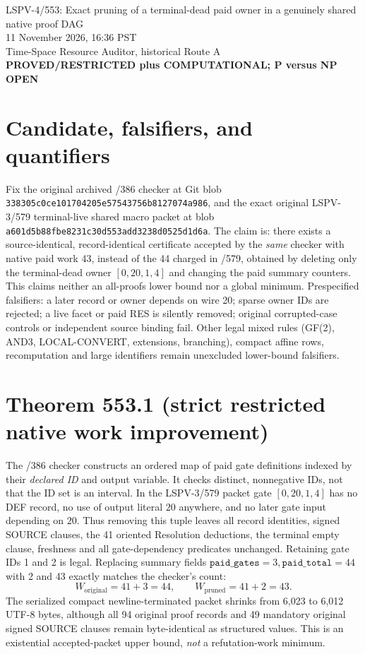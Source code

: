 \documentclass[11pt]{article}
\begin{document}
\begin{center}
{\Large LSPV-4/553: Exact pruning of a terminal-dead paid owner in a genuinely shared native proof DAG}\\[4pt]
11 November 2026, 16:36 PST\\
Time-Space Resource Auditor, historical Route A\\
\textbf{PROVED/RESTRICTED plus COMPUTATIONAL; P versus NP OPEN}
\end{center}
\section*{Candidate, falsifiers, and quantifiers}
Fix the original archived /386 checker at Git blob \texttt{338305c0ce101704205e57543756b8127074a986}, and the exact original LSPV-3/579 terminal-live shared macro packet at blob \texttt{a601d5b88fbe8231c30d553add3238d0525d1d6a}. The claim is: there exists a source-identical, record-identical certificate accepted by the \emph{same} checker with native paid work 43, instead of the 44 charged in /579, obtained by deleting only the terminal-dead owner \([0,20,1,4]\) and changing the paid summary counters. This claims neither an all-proofs lower bound nor a global minimum.
Prespecified falsifiers: a later record or owner depends on wire 20; sparse owner IDs are rejected; a live facet or paid RES is silently removed; original corrupted-case controls or independent source binding fail. Other legal mixed rules (GF(2), AND3, LOCAL-CONVERT, extensions, branching), compact affine rows, recomputation and large identifiers remain unexcluded lower-bound falsifiers.

\section*{Theorem 553.1 (strict restricted native work improvement)}
The /386 checker constructs an ordered map of paid gate definitions indexed by their \emph{declared ID} and output variable. It checks distinct, nonnegative IDs, not that the ID set is an interval. In the LSPV-3/579 packet gate \([0,20,1,4]\) has no DEF record, no use of output literal \(20\) anywhere, and no later gate input depending on \(20\). Thus removing this tuple leaves all record identities, signed SOURCE clauses, the 41 oriented Resolution deductions, the terminal empty clause, freshness and all gate-dependency predicates unchanged. Retaining gate IDs 1 and 2 is legal. Replacing summary fields \(\texttt{paid\_gates}=3,\texttt{paid\_total}=44\) with 2 and 43 exactly matches the checker's count:
\[
W_{\mathrm{original}}=41+3=44,\qquad
\boxed{W_{\mathrm{pruned}}=41+2=43}.
\]
The serialized compact newline-terminated packet shrinks from 6,023 to 6,012 UTF-8 bytes, although all 94 original proof records and 49 mandatory original signed SOURCE clauses remain byte-identical as structured values. This is an existential accepted-packet upper bound, \emph{not} a refutation-work minimum.
\end{document}
